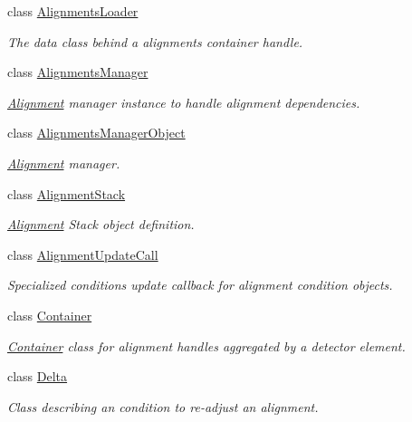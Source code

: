 \begin{DoxyCompactItemize}
class \hyperlink{class_d_d4hep_1_1_alignments_1_1_alignments_loader}{Alignments\+Loader}
\begin{DoxyCompactList}\small\item\em The data class behind a alignments container handle. \end{DoxyCompactList}\item 
class \hyperlink{class_d_d4hep_1_1_alignments_1_1_alignments_manager}{Alignments\+Manager}
\begin{DoxyCompactList}\small\item\em \hyperlink{class_d_d4hep_1_1_alignments_1_1_alignment}{Alignment} manager instance to handle alignment dependencies. \end{DoxyCompactList}\item 
class \hyperlink{class_d_d4hep_1_1_alignments_1_1_alignments_manager_object}{Alignments\+Manager\+Object}
\begin{DoxyCompactList}\small\item\em \hyperlink{class_d_d4hep_1_1_alignments_1_1_alignment}{Alignment} manager. \end{DoxyCompactList}\item 
class \hyperlink{class_d_d4hep_1_1_alignments_1_1_alignment_stack}{Alignment\+Stack}
\begin{DoxyCompactList}\small\item\em \hyperlink{class_d_d4hep_1_1_alignments_1_1_alignment}{Alignment} Stack object definition. \end{DoxyCompactList}\item 
class \hyperlink{class_d_d4hep_1_1_alignments_1_1_alignment_update_call}{Alignment\+Update\+Call}
\begin{DoxyCompactList}\small\item\em Specialized conditions update callback for alignment condition objects. \end{DoxyCompactList}\item 
class \hyperlink{class_d_d4hep_1_1_alignments_1_1_container}{Container}
\begin{DoxyCompactList}\small\item\em \hyperlink{class_d_d4hep_1_1_alignments_1_1_container}{Container} class for alignment handles aggregated by a detector element. \end{DoxyCompactList}\item 
class \hyperlink{class_d_d4hep_1_1_alignments_1_1_delta}{Delta}
\begin{DoxyCompactList}\small\item\em Class describing an condition to re-\/adjust an alignment. \end{DoxyCompactList}\item 

\end{DoxyCompactItemize}
